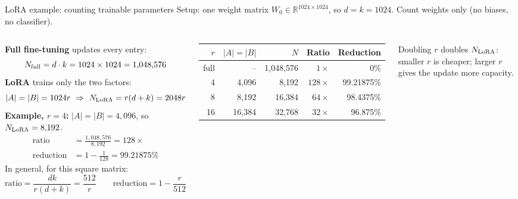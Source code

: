 \documentclass[aspectratio=169,10pt]{beamer}
\begin{document}
\begin{frame}{LoRA example: counting trainable parameters}
	\small Setup: one weight matrix $W_0\in\mathbb R^{1024\times1024}$, so $d=k=1024$. Count weights only (no biases, no classifier).
	\begin{columns}[T]
		\textbf{Full fine-tuning} updates every entry:
		\[N_{\rm full}=d\cdot k=1024\times1024=1{,}048{,}576\]
		\textbf{LoRA} trains only the two factors:
		\[|A|=|B|=1024r\ \Rightarrow\ N_{\rm LoRA}=r(d+k)=2048r\]
		\textbf{Example, $r=4$:} $|A|=|B|=4{,}096$, so $N_{\rm LoRA}=8{,}192$.
		\[\begin{aligned}
				\text{ratio}     & =\frac{1{,}048{,}576}{8{,}192}=128\times \\
				\text{reduction} & =1-\frac{1}{128}=99.21875\%
			\end{aligned}\]
		In general, for this square matrix:
		\[\text{ratio}=\frac{dk}{r(d+k)}=\frac{512}{r}\qquad\text{reduction}=1-\frac{r}{512}\]
		\centering\setlength{\tabcolsep}{4pt}\begin{tabular}{@{}rrrrr@{}}\toprule
			$r$  & $|A|=|B|$ & $N$       & Ratio       & Reduction  \\\midrule
			full & --        & 1,048,576 & $1\times$   & 0\%        \\
			4    & 4,096     & 8,192     & $128\times$ & 99.21875\% \\
			8    & 8,192     & 16,384    & $64\times$  & 98.4375\%  \\
			16   & 16,384    & 32,768    & $32\times$  & 96.875\%   \\\bottomrule
		\end{tabular}
		\par\raggedright\medskip Doubling $r$ doubles $N_{\rm LoRA}$: smaller $r$ is cheaper; larger $r$ gives the update more capacity.
	\end{columns}
\end{frame}
\end{document}
